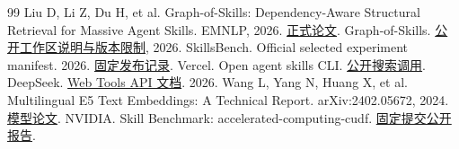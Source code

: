 \documentclass[final,5p,twocolumn,10pt]{elsarticle}
\begin{document}
\begin{thebibliography}{99}
 Liu D, Li Z, Du H, et al. Graph-of-Skills: Dependency-Aware Structural Retrieval for Massive Agent Skills. EMNLP, 2026. \href{https://aclanthology.org/2026.emnlp-main.2614/}{正式论文}.
 Graph-of-Skills. \href{https://github.com/davidliuk/graph-of-skills/blob/203f60a2c689da055ce1ac351eb3cb9912a3bca7/DATA.md}{公开工作区说明与版本限制}, 2026.
 SkillsBench. Official selected experiment manifest. 2026. \href{https://huggingface.co/datasets/benchflow/skillsbench-leaderboard/blob/f104580363a9642563593c475620196ecd36687d/analysis/experiment_final_selected_manifest.json}{固定发布记录}.
 Vercel. Open agent skills CLI. \href{https://github.com/vercel-labs/skills/blob/main/src/find.ts}{公开搜索调用}.
 DeepSeek. \href{https://api-docs.deepseek.com/guides/web_tools/}{Web Tools API 文档}. 2026.
 Wang L, Yang N, Huang X, et al. Multilingual E5 Text Embeddings: A Technical Report. arXiv:2402.05672, 2024. \href{https://arxiv.org/abs/2402.05672}{模型论文}.
 NVIDIA. Skill Benchmark: accelerated-computing-cudf. \href{https://github.com/NVIDIA/skills/blob/252ba53487b73eaafbfcccf3e750c7b350b93db9/skills/accelerated-computing-cudf/BENCHMARK.md}{固定提交公开报告}.
\end{thebibliography}
\endgroup
\end{document}

